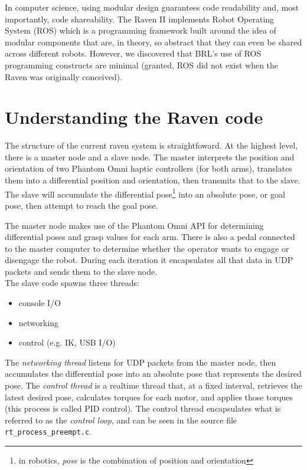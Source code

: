 \documentclass[letterpaper,twocolumn,10pt]{article}
\begin{document}
In computer science, using modular design guarantees code readability
and, most importantly, code shareability. The Raven II implements
Robot Operating System (ROS) which is a programming framework built
around the idea of modular components that are, in theory, so abstract
that they can even be shared across different robots. However, we
discovered that BRL's use of ROS programming constructs are minimal
(granted, ROS did not exist when the Raven was originally conceived).

\section{Understanding the Raven code}

The structure of the current raven system is straightfoward. At the
highest level, there is a master node and a slave node. The master
interprets the position and orientation of two Phantom Omni haptic
controllers (for both arms), translates them into a differential
position and orientation, then transmits that to the slave. The slave
will accumulate the differential pose\footnote{in robotics, \emph{pose}
  is the combination of position and orientation} into an absolute
pose, or goal pose, then attempt to reach the goal pose.

The master node makes use of the Phantom Omni API for determining
differential poses and grasp values for each arm. There is also a
pedal connected to the master computer to determine whether the
operator wants to engage or disengage the robot. During each iteration
it encapsulates all that data in UDP packets and sends them to the
slave node. \\

\noindent
The slave code spawns three threads:

\begin{itemize}
  \item console I/O
  \item networking
  \item control (e.g. IK, USB I/O)
\end{itemize}

The \emph{networking thread} listens for UDP packets from the master
node, then accumulates the differential pose into an absolute pose
that represents the desired pose. The \emph{control thread} is a
realtime thread that, at a fixed interval, retrieves the latest
desired pose, calculates torques for each motor, and applies those
torques (this process is called PID control). The control thread
encapsulates what is referred to as the \emph{control loop}, and can
be seen in the source file \texttt{rt\_process\_preempt.c}.
\end{document}
